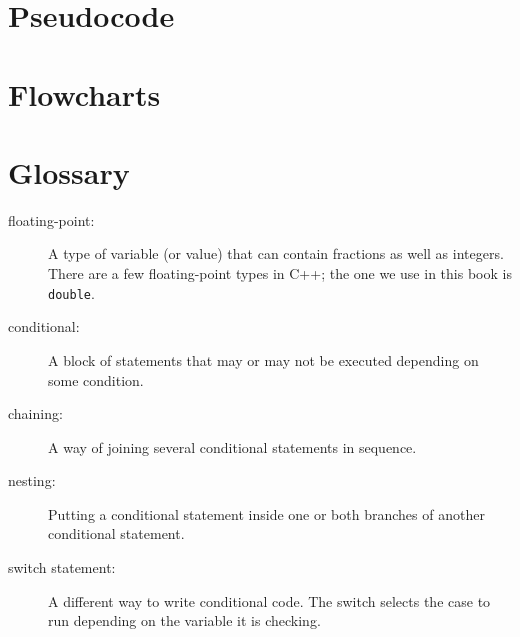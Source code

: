 \section{Pseudocode}
\section{Flowcharts}
\section{Glossary}

\begin{description}
\item[floating-point:] A type of variable (or value) that can contain
fractions as well as integers.  There are a few floating-point types
in C++; the one we use in this book is {\tt double}.

\item[conditional:]  A block of statements that may or may not
be executed depending on some condition.

\item[chaining:]  A way of joining several conditional statements
in sequence.

\item[nesting:] Putting a conditional statement inside one or both
branches of another conditional statement.

\item[switch statement:] A different way to write conditional code. The switch selects the case to run depending on the variable it is checking.


\end{description}



